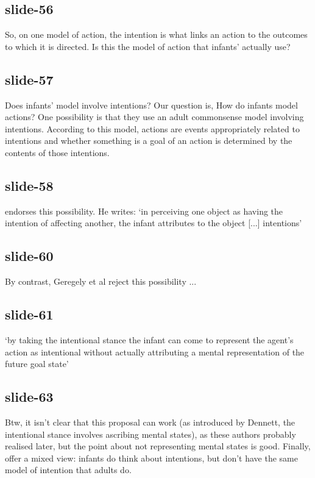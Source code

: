 \documentclass[12pt,\papersize]{extarticle}
\begin{document}
 
\subsection{slide-56}
So, on one model of action, the intention is what links an action to the outcomes to which it is directed. Is this the model of action that infants' actually use?
 
 
\subsection{slide-57}
Does infants’ model involve intentions?
Our question is, How do infants model actions? One possibility is that they use an adult commonsense model involving intentions. According to this model, actions are events appropriately related to intentions and whether something is a goal of an action is determined by the contents of those intentions.
 
 
\subsection{slide-58}
\citet{Premack:1990jl} endorses this possibility. He writes:
‘in perceiving one object as having the intention of affecting another, the infant attributes to the object [...] intentions’
 
 
\subsection{slide-60}
\citep[p.\ 14]{Premack:1990jl}
By contrast, Geregely et al reject this possibility ...
 
 
\subsection{slide-61}
‘by taking the intentional stance the infant can come to represent the agent’s action as intentional without actually attributing a mental representation of the future goal state’
\citep[p.\ 188]{Gergely:1995sq}
 
 
\subsection{slide-63}
Btw, it isn't clear that this proposal can work (as introduced by Dennett, the intentional stance involves ascribing mental states), as these authors probably realised later, but the point about not representing mental states is good.
Finally, \citet{woodward:2001_making} offer a mixed view: infants do think about intentions, but don't have the same model of intention that adults do.
 
\end{document}
